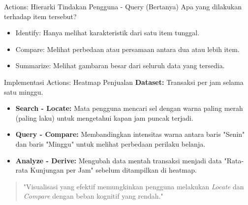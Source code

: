 \documentclass[t]{beamer}
\begin{document}
\begin{frame}{Actions: Hierarki Tindakan Pengguna - Query (Bertanya)}
Apa yang dilakukan terhadap item tersebut?
\begin{itemize}
	\item Identify: Hanya melihat karakteristik dari satu item tunggal.
	\item Compare: Melihat perbedaan atau persamaan antara dua atau lebih item.
	\item Summarize: Melihat gambaran besar dari seluruh data yang tersedia.
\end{itemize}
\end{frame}


\begin{frame}{Implementasi Actions: Heatmap Penjualan}
    \textbf{Dataset:} Transaksi per jam selama satu minggu.
    
    \begin{itemize}
        \item \textbf{Search - Locate:} 
        Mata pengguna mencari sel dengan warna paling merah (paling laku) untuk mengetahui kapan jam puncak terjadi.
        
        \item \textbf{Query - Compare:} 
        Membandingkan intensitas warna antara baris "Senin" dan baris "Minggu" untuk melihat perbedaan perilaku belanja.
        
        \item \textbf{Analyze - Derive:} 
        Mengubah data mentah transaksi menjadi data "Rata-rata Kunjungan per Jam" sebelum ditampilkan di heatmap.
    \end{itemize}
    
    \vspace{0.3cm}
    \begin{quote}
        "Visualisasi yang efektif memungkinkan pengguna melakukan \textit{Locate} dan \textit{Compare} dengan beban kognitif yang rendah."
    \end{quote}
\end{frame}


\end{document}
